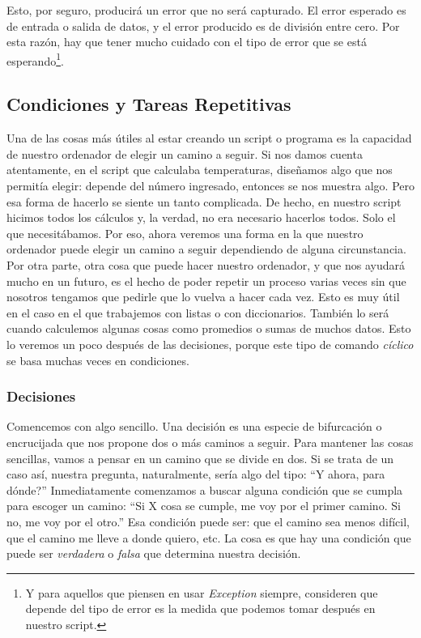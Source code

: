 \documentclass[10pt,letterpaper]{article}
\begin{document}
Esto, por seguro, producir\'a un error que no ser\'a capturado. El error esperado es de entrada o salida de datos, y el error producido es de divisi\'on entre cero. Por esta raz\'on, hay que tener mucho cuidado con el tipo de error que se est\'a esperando\footnote{Y para aquellos que piensen en usar \textit{Exception} siempre, consideren que depende del tipo de error es la medida que podemos tomar despu\'es en nuestro script.}.

\subsection{Condiciones y Tareas Repetitivas}
Una de las cosas m\'as \'utiles al estar creando un script o programa es la capacidad de nuestro ordenador de elegir un camino a seguir. Si nos damos cuenta atentamente, en el script que calculaba temperaturas, dise\~namos algo que nos permit\'ia elegir: depende del n\'umero ingresado, entonces se nos muestra algo. Pero esa forma de hacerlo se siente un tanto complicada. De hecho, en nuestro script hicimos todos los c\'alculos y, la verdad, no era necesario hacerlos todos. Solo el que necesit\'abamos. Por eso, ahora veremos una forma en la que nuestro ordenador puede elegir un camino a seguir dependiendo de alguna circunstancia.\\

Por otra parte, otra cosa que puede hacer nuestro ordenador, y que nos ayudar\'a mucho en un futuro, es el hecho de poder repetir un proceso varias veces sin que nosotros tengamos que pedirle que lo vuelva a hacer cada vez. Esto es muy \'util en el caso en el que trabajemos con listas o con diccionarios. Tambi\'en lo ser\'a cuando calculemos algunas cosas como promedios o sumas de muchos datos. Esto lo veremos un poco despu\'es de las decisiones, porque este tipo de comando \emph{c\'iclico} se basa muchas veces en condiciones.

\subsubsection{Decisiones}
Comencemos con algo sencillo. Una decisi\'on es una especie de bifurcaci\'on o encrucijada que nos propone dos o m\'as caminos a seguir. Para mantener las cosas sencillas, vamos a pensar en un camino que se divide en dos. Si se trata de un caso as\'i, nuestra pregunta, naturalmente, ser\'ia algo del tipo: ``Y ahora, para d\'onde?'' Inmediatamente comenzamos a buscar alguna condici\'on que se cumpla para escoger un camino: ``Si X cosa se cumple, me voy por el primer camino. Si no, me voy por el otro.'' Esa condici\'on puede ser: que el camino sea menos dif\'icil, que el camino me lleve a donde quiero, etc. La cosa es que hay una condici\'on que puede ser \emph{verdadera} o \emph{falsa} que determina nuestra decisi\'on.\\
\end{document}
